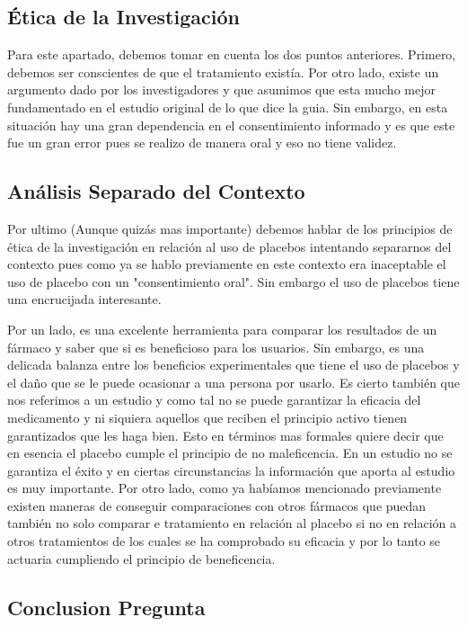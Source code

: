 \subsection*{Ética de la Investigación}

Para este apartado, debemos tomar en cuenta los dos puntos anteriores. Primero, debemos ser conscientes de que el tratamiento existía. Por otro lado, existe un argumento dado por los investigadores y que asumimos que esta mucho mejor fundamentado en el estudio original de lo que dice la guia. Sin embargo, en esta situación hay una gran dependencia en el consentimiento informado y es que este fue un gran error pues se realizo de manera oral y eso no tiene validez.

\subsection*{Análisis Separado del Contexto}

Por ultimo (Aunque quizás mas importante) debemos hablar de los principios de ética de la investigación en relación al uso de placebos intentando separarnos del contexto pues como ya se hablo previamente en este contexto era inaceptable el uso de placebo con un "consentimiento oral". Sin embargo el uso de placebos tiene una encrucijada interesante.

Por un lado, es una excelente herramienta para comparar los resultados de un fármaco y saber que si es beneficioso para los usuarios. Sin embargo, es una delicada balanza entre los beneficios experimentales que tiene el uso de placebos y el daño que se le puede ocasionar a una persona por usarlo. Es cierto también que nos referimos a un estudio y como tal no se puede garantizar la eficacia del medicamento y ni siquiera aquellos que reciben el principio activo tienen garantizados que les haga bien. Esto en términos mas formales quiere decir que en esencia el placebo cumple el principio de no maleficencia. En un estudio no se garantiza el éxito y en ciertas circunstancias la información que aporta al estudio es muy importante. Por otro lado, como ya habíamos mencionado previamente existen maneras de conseguir comparaciones con otros fármacos que puedan también no solo comparar e tratamiento en relación al placebo si no en relación a otros tratamientos de los cuales se ha comprobado su eficacia y por lo tanto se actuaria cumpliendo el principio de beneficencia.

\subsection*{Conclusion Pregunta}

